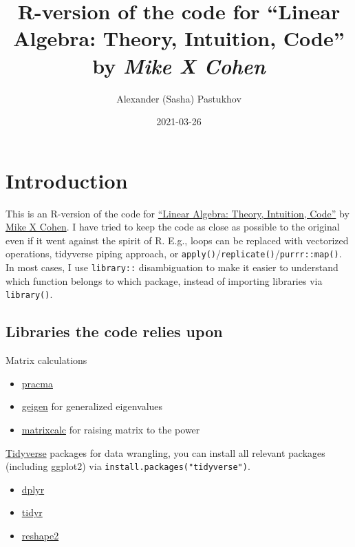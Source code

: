 \documentclass[
]{book}
\title{R-version of the code for ``Linear Algebra: Theory, Intuition, Code'' by \emph{Mike X Cohen}}
\author{Alexander (Sasha) Pastukhov}
\date{2021-03-26}
\providecommand{\tightlist}{%
  \setlength{\itemsep}{0pt}\setlength{\parskip}{0pt}}
\begin{document}
\maketitle

{
\setcounter{tocdepth}{1}
\tableofcontents
}
\hypertarget{introduction}{%
\chapter*{Introduction}\label{introduction}}

This is an R-version of the code for \href{https://www.amazon.com/Linear-Algebra-Theory-Intuition-Code/dp/9083136604}{``Linear Algebra: Theory, Intuition, Code''} by \href{http://www.mikexcohen.com/}{Mike X Cohen}. I have tried to keep the code as close as possible to the original even if it went against the spirit of R. E.g., loops can be replaced with vectorized operations, tidyverse piping approach, or \texttt{apply()}/\texttt{replicate()}/\texttt{purrr::map()}. In most cases, I use \texttt{library::} disambiguation to make it easier to understand which function belongs to which package, instead of importing libraries via \texttt{library()}.

\hypertarget{libraries-the-code-relies-upon}{%
\section*{Libraries the code relies upon}\label{libraries-the-code-relies-upon}}

Matrix calculations

\begin{itemize}
\tightlist
\item
  \href{https://rdrr.io/cran/pracma/}{pracma}
\item
  \href{https://rdrr.io/cran/geigen/}{geigen} for generalized eigenvalues
\item
  \href{https://rdrr.io/cran/matrixcalc/}{matrixcalc} for raising matrix to the power
\end{itemize}

\href{https://tidyverse.org/}{Tidyverse} packages for data wrangling, you can install all relevant packages (including ggplot2) via \texttt{install.packages("tidyverse")}.

\begin{itemize}
\tightlist
\item
  \href{https://dplyr.tidyverse.org/}{dplyr}
\item
  \href{https://tidyr.tidyverse.org/}{tidyr}
\item
  \href{https://www.rdocumentation.org/packages/reshape2/versions/1.4.4}{reshape2}
\end{itemize}
\end{document}
